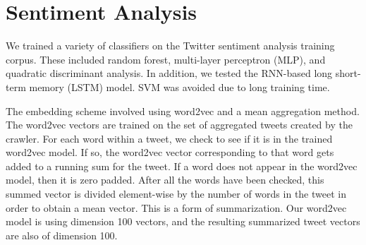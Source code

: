 \documentclass{sig-alternate-05-2015}
\begin{document}
	\section{Sentiment Analysis}
	We trained a variety of classifiers on the Twitter sentiment analysis training corpus. These included random forest, multi-layer perceptron (MLP), and quadratic discriminant analysis. In addition, we tested the RNN-based long short-term memory (LSTM) model. SVM was avoided due to long training time.
	\par
	 The embedding scheme involved using word2vec and a mean aggregation method. The word2vec vectors are trained on the set of aggregated tweets created by the crawler. For each word within a tweet, we check to see if it is in the trained word2vec model. If so, the word2vec vector corresponding to that word gets added to a running sum for the tweet. If a word does not appear in the word2vec model, then it is zero padded. After all the words have been checked, this summed vector is divided element-wise by the number of words in the tweet in order to obtain a mean vector. This is a form of summarization. Our word2vec model is using dimension 100 vectors, and the resulting summarized tweet vectors are also of dimension 100.
\end{document}

